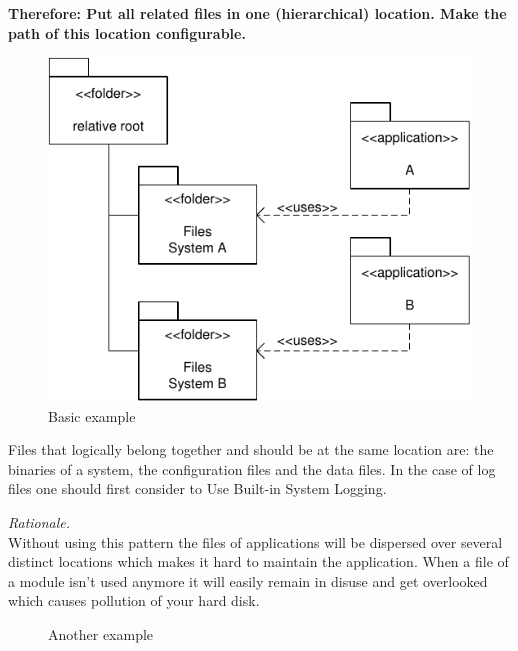 \begin{center}
   
\end{center}

\textbf{Therefore: Put all related files in one (hierarchical) location. Make the path of this location configurable.}\\

\begin{figure}[h]
\centering
\includegraphics{patterns/singleFileLocationDiagram-01.pdf}
\caption{Basic example}
\label{fig:singleFileLocationDiagram-01}
\end{figure}

Files that logically belong together and should be at the same location are: the binaries of a system, the configuration files and the data files. In the case of log files one should first consider to {\sc Use Built-in System Logging}.

 
\begin{center}
   
\end{center}

\textit{Rationale.}\\
Without using this pattern the files of applications will be dispersed over several distinct locations which makes it hard to maintain the application. When a file of a module isn't used anymore it will easily remain in disuse and get overlooked which causes pollution of your hard disk.

\begin{figure}[h]
\centering
\caption{Another example}
\label{fig:singleFileLocationDiagram-02}
\end{figure}
